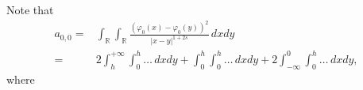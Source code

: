 \documentclass[10 pt]{article}
\numberwithin{equation}{section}
\newcommand{\RR}{\mathbb{R}}
\begin{document}
Note that
	\begin{align*}
	a_{0,0}= & \int_{\RR}\int_{\RR}\frac{(\varphi_0(x)-\varphi_0(y))^2}{|x-y|^{1+2s}}\,dxdy
	\\
	=& 2\int_{h}^{+\infty}\int_{0}^{h} \ldots\,dxdy  + \int_{0}^{h}\int_{0}^{h} \ldots\,dxdy + 2\int_{-\infty}^{0}\int_{0}^{h} \ldots\,dxdy,
\end{align*}
where 













\end{document}
